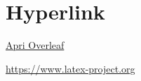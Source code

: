 \documentclass[a4paper,11pt]{article} %
\begin{document}



\section{Hyperlink} %
\href{https://www.overleaf.com} %
  {Apri Overleaf} %

\url{https://www.latex-project.org} %
\end{document}
